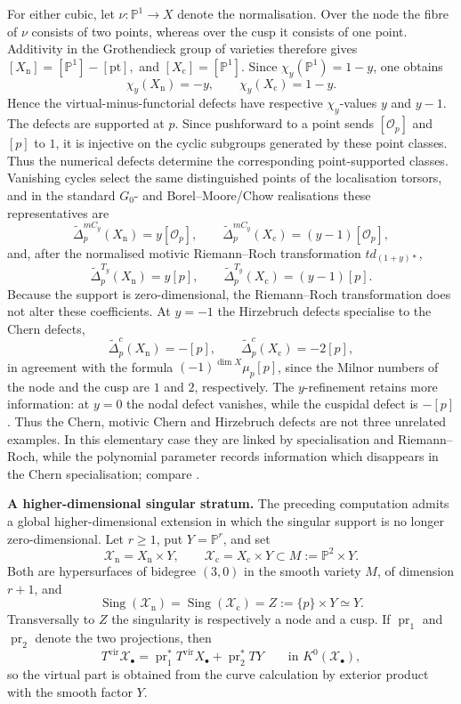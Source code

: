 \documentclass[10pt,a4paper,dvipsnames,x11names]{amsart}
\numberwithin{equation}{section}
\theoremstyle{plain}
\theoremstyle{definition}
\theoremstyle{remark}
\begin{document}
For either cubic, let $\nu:\mathbb P^1\to X$ denote the normalisation.  Over the node the fibre of $\nu$ consists of two points, whereas over the cusp it consists of one point.  Additivity in the Grothendieck group of varieties therefore gives
$
[X_{\mathrm n}]=[\mathbb P^1]-[\mathrm{pt}],
$ and $
[X_{\mathrm c}]=[\mathbb P^1].
$
Since $\chi_y(\mathbb P^1)=1-y$, one obtains
\[
\chi_y(X_{\mathrm n})=-y,
\qquad
\chi_y(X_{\mathrm c})=1-y.
\]
Hence the virtual-minus-functorial defects have respective $\chi_y$-values
$
y$ and $
y-1.$
The defects are supported at $p$.  Since pushforward to a point sends $[\mathcal O_p]$ and $[p]$ to $1$, it is injective on the cyclic subgroups generated by these point classes.  Thus the numerical defects determine the corresponding point-supported classes.  Vanishing cycles select the same distinguished points of the localisation torsors, and in the standard $G_0$- and Borel--Moore/Chow realisations these representatives are
\[
\widetilde\Delta^{mC_y}_{p}(X_{\mathrm n})
=y[\mathcal O_p],
\qquad
\widetilde\Delta^{mC_y}_{p}(X_{\mathrm c})
=(y-1)[\mathcal O_p],
\]
and, after the normalised motivic Riemann--Roch transformation $td_{(1+y)*}$,
\[
\widetilde\Delta^{T_y}_{p}(X_{\mathrm n})
=y[p],
\qquad
\widetilde\Delta^{T_y}_{p}(X_{\mathrm c})
=(y-1)[p].
\]
Because the support is zero-dimensional, the Riemann--Roch transformation does not alter these coefficients.  At $y=-1$ the Hirzebruch defects specialise to the Chern defects,
\[
\widetilde\Delta^{c}_{p}(X_{\mathrm n})=-[p],
\qquad
\widetilde\Delta^{c}_{p}(X_{\mathrm c})=-2[p],
\]
in agreement with the formula $(-1)^{\dim X}\mu_p[p]$, since the Milnor numbers of the node and the cusp are $1$ and $2$, respectively.  The $y$-refinement retains more information: at $y=0$ the nodal defect vanishes, while the cuspidal defect is $-[p]$.  Thus the Chern, motivic Chern and Hirzebruch defects are not three unrelated examples.  In this elementary case they are linked by specialisation and Riemann--Roch, while the polynomial parameter records information which disappears in the Chern specialisation; compare \cite{BrasseletSchuermannYokura,CappellMaximSchuermannShaneson}.

\medskip
\noindent\textbf{A higher-dimensional singular stratum.}
The preceding computation admits a global higher-dimensional extension in which the singular support is no longer zero-dimensional.  Let $r\geq 1$, put $Y=\mathbb P^r$, and set
\[
\mathcal X_{\mathrm n}=X_{\mathrm n}\times Y,
\qquad
\mathcal X_{\mathrm c}=X_{\mathrm c}\times Y
\subset M:=\mathbb P^2\times Y.
\]
Both are hypersurfaces of bidegree $(3,0)$ in the smooth variety $M$, of dimension $r+1$, and
\[
\operatorname{Sing}(\mathcal X_{\mathrm n})
=
\operatorname{Sing}(\mathcal X_{\mathrm c})
=
Z:=\{p\}\times Y\simeq Y.
\]
Transversally to $Z$ the singularity is respectively a node and a cusp.  If $\operatorname{pr}_1$ and $\operatorname{pr}_2$ denote the two projections, then
\[
T^{\mathrm{vir}}\mathcal X_{\bullet}
=
\operatorname{pr}_1^*T^{\mathrm{vir}}X_{\bullet}
+
\operatorname{pr}_2^*TY
\qquad \text{in }K^0(\mathcal X_{\bullet}),
\]
so the virtual part is obtained from the curve calculation by exterior product with the smooth factor $Y$.
\end{document}
